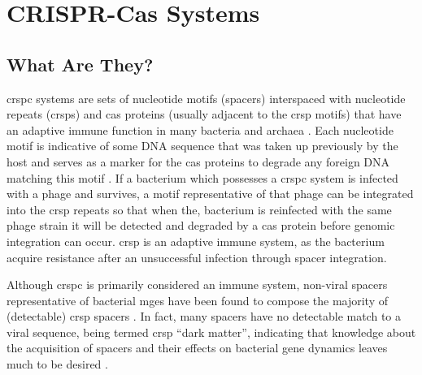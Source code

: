 \section{CRISPR-Cas Systems}
\subsection{What Are They?}
\ac{crspc} systems are sets of nucleotide motifs (spacers) interspaced with nucleotide repeats (\ac{crsp}s) and \ac{cas} proteins (usually adjacent to the \ac{crsp} motifs) that have an adaptive immune function in many bacteria and archaea \citep{crispgen}.
Each nucleotide motif is indicative of some DNA sequence that was taken up previously by the host and serves as a marker for the \ac{cas} proteins to degrade any foreign DNA matching this motif \citep{crispgen}.
If a bacterium which possesses a \ac{crspc} system is infected with a phage and survives, a motif representative of that phage can be integrated into the \ac{crsp} repeats so that when the, bacterium is reinfected with the same phage strain it will be detected and degraded by a \ac{cas} protein before genomic integration can occur.
\ac{crsp} is an adaptive immune system, as the bacterium acquire resistance after an unsuccessful infection through spacer integration.\par
Although \ac{crspc} is primarily considered an immune system, non-viral spacers representative of bacterial \ac{mge}s have been found to compose the majority of (detectable) \ac{crsp} spacers \citep{nonvspacer}.
In fact, many spacers have no detectable match to a viral sequence, being termed \ac{crsp} ``dark matter'', indicating that knowledge about the acquisition of spacers and their effects on bacterial gene dynamics leaves much to be desired \citep{nonvspacer}.
